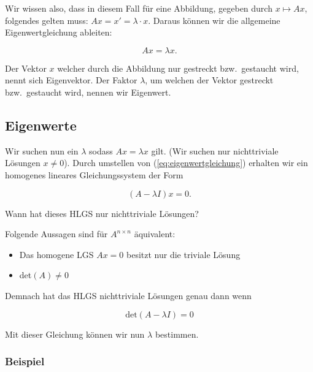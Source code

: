 Wir wissen also, dass in diesem Fall für eine Abbildung, gegeben durch \( x \mapsto Ax \), folgendes gelten muss: \( Ax = x' = \lambda \cdot x \). Daraus können wir die allgemeine Eigenwertgleichung ableiten:

\begin{equation}
    Ax = \lambda x.
    \label{eq:eigenwertgleichung}
\end{equation}

Der Vektor \(x \) welcher durch die Abbildung nur gestreckt bzw.\ gestaucht wird, nennt sich Eigenvektor. Der Faktor \( \lambda \), um welchen der Vektor gestreckt bzw.\ gestaucht wird, nennen wir Eigenwert.

\subsection{Eigenwerte}

Wir suchen nun ein \( \lambda \) sodass \( Ax = \lambda x \) gilt. (Wir suchen nur nichttriviale Lösungen \(x \neq 0\)). Durch umstellen von (\ref{eq:eigenwertgleichung})  erhalten wir ein homogenes lineares Gleichungssystem der Form

\begin{equation}
    (A - \lambda I) x = 0.
    \label{eq:eigenwertgleichung_homogen}
\end{equation}

Wann hat dieses HLGS nur nichttriviale Lösungen? 

\begin{tcolorbox}[colback=gray!30, colframe=gray!80, title=Erinnerung aus der Linearen Algebra I]
    Folgende Aussagen sind für \( A^{n \times n} \) äquivalent:
    \begin{itemize}
        \item Das homogene LGS \( Ax = 0 \) besitzt nur die triviale Lösung 
        \item det\( (A) \neq 0 \)
    \end{itemize}
\end{tcolorbox}

Demnach hat das HLGS nichttriviale Lösungen genau dann wenn 

\begin{equation*}
    \text{det}(A - \lambda I) = 0
\end{equation*}

Mit dieser Gleichung können wir nun \( \lambda \) bestimmen.

\subsubsection*{Beispiel}

